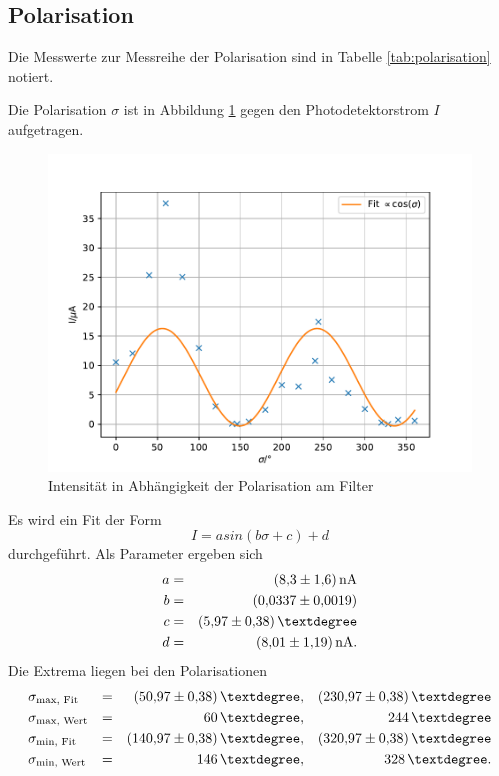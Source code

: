 \subsection{Polarisation}
Die Messwerte zur Messreihe der Polarisation sind in Tabelle \ref{tab:polarisation} notiert.

Die Polarisation $\sigma$ ist in Abbildung \ref{fig:polarisation} gegen den Photodetektorstrom $I$ aufgetragen.
\begin{figure}
  \centering
  \includegraphics[width=\textwidth]{polarisation.pdf}
  \caption{Intensität in Abhängigkeit der Polarisation am Filter}
  \label{fig:polarisation}
\end{figure}
Es wird ein Fit der Form
\begin{equation*}
  I= a sin(b \sigma +c)+d
\end{equation*}
durchgeführt.
Als Parameter ergeben sich
\begin{align*}
  a &=& \SI{ 8.3 \pm 1.6 }{nA} \\
  b &=& \SI{ 0.0337 \pm 0.0019 }{} \\
  c &=& \SI{ 5.97 \pm 0.38 }{°} \\
  d &=& \SI{ 8.01 \pm 1.19 }{nA}. \\
\end{align*}
%
%
Die Extrema liegen bei den Polarisationen
\begin{align*}
  &\sigma_{\text{max, Fit}} &=&& \SI{50.97 \pm 0.38}{°},   && \SI{230.97 \pm 0.38}{°} \\
  &\sigma_{\text{max, Wert}} &=&& \SI{ 60 }{°},                          && \SI{ 244 }{°} \\
  &\sigma_{\text{min, Fit}} &=&& \SI{140.97 \pm 0.38}{°},  && \SI{320.97 \pm 0.38}{°} \\
  &\sigma_{\text{min, Wert}} &=&& \SI{ 146 }{°},                         && \SI{ 328 }{°}. \\
\end{align*}
\FloatBarrier
